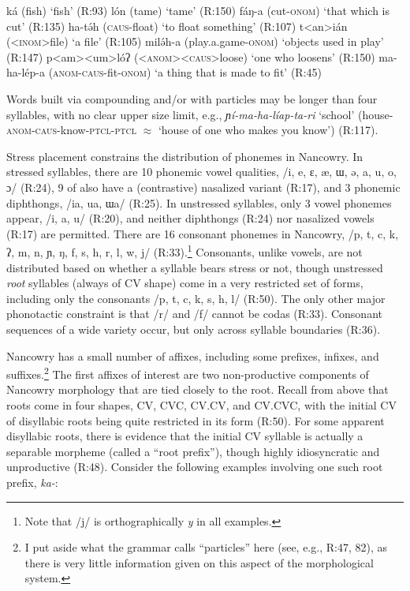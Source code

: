 \documentclass[output=paper]{langscibook}
\begin{document}
\ea \label{kalinone}
\ea k\'a (fish) \hfill `fish' (R:93)
\ex l\'on (tame) \hfill `tame' (R:150)
\ex f\'aŋ-a (cut-\textsc{onom}) \hfill `that which is cut' (R:135)
\ex ha-t\'əh (\textsc{caus}-float) \hfill `to float something' (R:107)
\ex t<an>i\'an (\textsc{<inom>}file) \hfill `a file'  (R:105)
\ex mil\'əh-a (play.a.game-\textsc{onom}) \hfill `objects used in play' (R:147)
\ex p<am><um>l\'oʔ (\textsc{<anom><caus>}loose) \hfill `one who loosens' (R:150)
\ex ma-ha-l\'ep-a (\textsc{anom-caus}-fit-\textsc{onom}) \hfill `a thing that is made to fit'  (R:45)
\z
\z

\noindent Words built via compounding and/or with particles may be longer than four syllables, with no clear upper size limit, e.g., \textit{ɲ\'i-ma-ha-l\'iap-ta-ri} `school' (house-\textsc{anom-caus-}know-\textsc{ptcl-ptcl}  $\approx$ `house of one who makes you know') (R:117).

Stress placement constrains the distribution of phonemes in Nancowry. In stressed syllables, there are 10 phonemic vowel qualities, /i, e, ɛ, \ae, ɯ, ə, a, u, o, ɔ/ (R:24), 9 of also have a (contrastive) nasalized variant (R:17), and 3 phonemic diphthongs, /ia, ua, ɯa/ (R:25). In unstressed syllables, only 3 vowel phonemes appear, /i, a, u/ (R:20), and neither diphthongs (R:24) nor nasalized vowels (R:17) are permitted. There are 16 consonant phonemes in Nancowry, /p, t, c, k, ʔ, m, n, ɲ, ŋ, f, s, h, r, l, w, j/ (R:33).\footnote{Note that /j/ is orthographically \textit{y} in all examples.} Consonants, unlike vowels, are not distributed based on whether a syllable bears stress or not, though unstressed \textit{root} syllables (always of CV shape) come in a very restricted set of forms, including only the consonants /p, t, c, k, s, h, l/ (R:50). The only other major phonotactic constraint is that /r/ and /f/ cannot be codas (R:33). Consonant sequences of a wide variety occur, but only across syllable boundaries (R:36).

Nancowry has a small number of affixes, including some prefixes, infixes, and suffixes.\footnote{I put aside what the grammar calls ``particles'' here (see, e.g., R:47, 82), as there is very little information given on this aspect of the morphological system.} The first affixes of interest are two non-productive components of Nancowry morphology that are tied closely to the root. Recall from above that roots come in four shapes, CV, CVC, CV.CV, and CV.CVC, with the initial CV of disyllabic roots being quite restricted in its form (R:50). For some apparent disyllabic roots, there is evidence that the initial CV syllable is actually a separable morpheme (called a ``root prefix''), though highly idiosyncratic and unproductive (R:48). Consider the following examples involving one such root prefix, \textit{ka-}:
\end{document}
